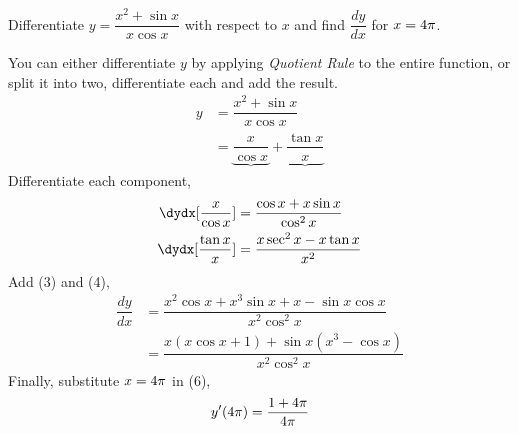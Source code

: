 

\question[4] Differentiate $y=\dfrac{x^2+\sin x}{x\cos x}$ with respect to $x$
and find $\dfrac{dy}{dx}$ for $x=4\pi$.

\insertQR{}

\watchout

\begin{solution}[\halfpage]
  You can either differentiate $y$ by applying \textit{Quotient Rule} to the
  entire function, or split it into two, differentiate each and add the
  result.
  \begin{align}
    y &= \dfrac{x^2+\sin x}{x\cos x} \\
      &= \underbrace{\dfrac{x}{\cos x}} + \underbrace{\dfrac{\tan x}{x}} 
  \end{align}
  Differentiate each component,
  \begin{align}
    \dydx[\dfrac{x}{\cos x}] &= \dfrac{\cos x + x\sin x}{\cos^2 x} \\
    \dydx[\dfrac{\tan x}{x}] &= \dfrac{x\sec^2 x - x\tan x}{x^2} 
  \end{align}
  Add (3) and (4),
  \begin{align}
    \dfrac{dy}{dx} &= \dfrac{x^2\cos x + x^3\sin x + x - \sin x\cos x}{x^2\cos^2 x} \\
                   &= \dfrac{x(x\cos x + 1) + \sin x(x^3 - \cos x)}{x^2\cos^2 x}
  \end{align}
  Finally, substitute $x=4\pi$ in (6),
  \begin{align}
    y'(4\pi) = \dfrac{1+4\pi}{4\pi}
  \end{align}
\end{solution}

